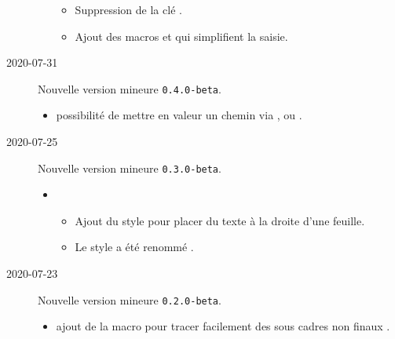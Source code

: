 \documentclass[12pt,a4paper]{article}
\begin{document}
\begin{description}
\begin{itemize}[itemsep=.5em]
\begin{itemize}[itemsep=.5em]
            \item Suppression de la clé .
            
            \item Ajout des macros  et  qui simplifient la saisie.
        \end{itemize}
    \end{itemize}
    
    \separation


    \medskip
    \item[2020-07-31] Nouvelle version mineure \verb+0.4.0-beta+.
    
    \begin{itemize}[itemsep=.5em]
        \item {}
        	  possibilité de mettre en valeur un chemin via ,   ou .
    \end{itemize}
    
    \separation

    \medskip
    \item[2020-07-25] Nouvelle version mineure \verb+0.3.0-beta+.
    
    \begin{itemize}[itemsep=.5em]
        \item {}
        \begin{itemize}[itemsep=.5em]
            \item Ajout du style  pour placer du texte à la droite d'une feuille.
    
            \item Le style  a été renommé .
        \end{itemize}
    \end{itemize}
    
    \separation

    \medskip
    \item[2020-07-23] Nouvelle version mineure \verb+0.2.0-beta+.
    
    \begin{itemize}[itemsep=.5em]
        \item {}
              ajout de la macro  pour tracer facilement des sous cadres non \og finaux \fg.
    \end{itemize}
    

\end{description}
\end{document}
